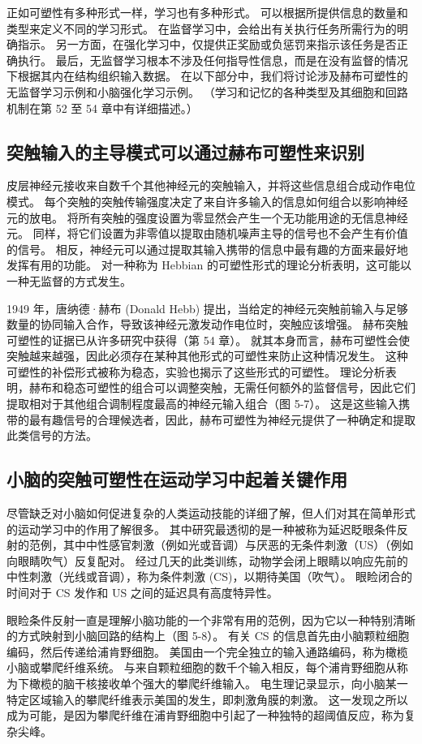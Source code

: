 正如可塑性有多种形式一样，学习也有多种形式。 可以根据所提供信息的数量和类型来定义不同的学习形式。 在监督学习中，会给出有关执行任务所需行为的明确指示。 另一方面，在强化学习中，仅提供正奖励或负惩罚来指示该任务是否正确执行。 最后，无监督学习根本不涉及任何指导性信息，而是在没有监督的情况下根据其内在结构组织输入数据。 在以下部分中，我们将讨论涉及赫布可塑性的无监督学习示例和小脑强化学习示例。 （学习和记忆的各种类型及其细胞和回路机制在第 52 至 54 章中有详细描述。）

\subsection{突触输入的主导模式可以通过赫布可塑性来识别}
皮层神经元接收来自数千个其他神经元的突触输入，并将这些信息组合成动作电位模式。 每个突触的突触传输强度决定了来自许多输入的信息如何组合以影响神经元的放电。 将所有突触的强度设置为零显然会产生一个无功能用途的无信息神经元。 同样，将它们设置为非零值以提取由随机噪声主导的信号也不会产生有价值的信号。 相反，神经元可以通过提取其输入携带的信息中最有趣的方面来最好地发挥有用的功能。 对一种称为 Hebbian 的可塑性形式的理论分析表明，这可能以一种无监督的方式发生。

1949 年，唐纳德·赫布 (Donald Hebb) 提出，当给定的神经元突触前输入与足够数量的协同输入合作，导致该神经元激发动作电位时，突触应该增强。 赫布突触可塑性的证据已从许多研究中获得（第 54 章）。 就其本身而言，赫布可塑性会使突触越来越强，因此必须存在某种其他形式的可塑性来防止这种情况发生。 这种可塑性的补偿形式被称为稳态，实验也揭示了这些形式的可塑性。 理论分析表明，赫布和稳态可塑性的组合可以调整突触，无需任何额外的监督信号，因此它们提取相对于其他组合调制程度最高的神经元输入组合（图 5-7）。 这是这些输入携带的最有趣信号的合理候选者，因此，赫布可塑性为神经元提供了一种确定和提取此类信号的方法。

\subsection{小脑的突触可塑性在运动学习中起着关键作用}
尽管缺乏对小脑如何促进复杂的人类运动技能的详细了解，但人们对其在简单形式的运动学习中的作用了解很多。 其中研究最透彻的是一种被称为延迟眨眼条件反射的范例，其中中性感官刺激（例如光或音调）与厌恶的无条件刺激（US）（例如向眼睛吹气）反复配对。 经过几天的此类训练，动物学会闭上眼睛以响应先前的中性刺激（光线或音调），称为条件刺激 (CS)，以期待美国（吹气）。 眼睑闭合的时间对于 CS 发作和 US 之间的延迟具有高度特异性。

眼睑条件反射一直是理解小脑功能的一个非常有用的范例，因为它以一种特别清晰的方式映射到小脑回路的结构上（图 5-8）。 有关 CS 的信息首先由小脑颗粒细胞编码，然后传递给浦肯野细胞。 美国由一个完全独立的输入通路编码，称为橄榄小脑或攀爬纤维系统。 与来自颗粒细胞的数千个输入相反，每个浦肯野细胞从称为下橄榄的脑干核接收单个强大的攀爬纤维输入。 电生理记录显示，向小脑某一特定区域输入的攀爬纤维表示美国的发生，即刺激角膜的刺激。 这一发现之所以成为可能，是因为攀爬纤维在浦肯野细胞中引起了一种独特的超阈值反应，称为复杂尖峰。

